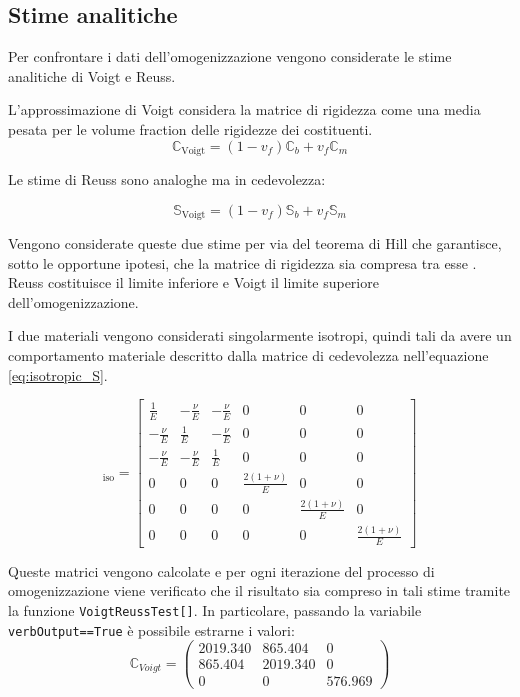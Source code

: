 \documentclass[a4paper,num-refs]{oup-contemporary}
\begin{document}
\subsection{Stime analitiche}

Per confrontare i dati dell'omogenizzazione vengono considerate le stime analitiche di Voigt e Reuss. 

L'approssimazione di Voigt considera la matrice di rigidezza come una media pesata per le volume fraction delle rigidezze dei costituenti. 
\begin{equation}
	\mathbb C_{\operatorname{Voigt}}=(1-v_f)\mathbb C_b+v_f \mathbb C_m
\end{equation}

Le stime di Reuss sono analoghe ma in cedevolezza:

\begin{equation}
	\mathbb S_{\operatorname{Voigt}}=(1-v_f)\mathbb S_b+v_f \mathbb S_m
\end{equation}

Vengono considerate queste due stime per via del teorema di Hill che garantisce, sotto le opportune ipotesi, che la matrice di rigidezza sia compresa tra esse \citep{ABOUDI201387}. Reuss costituisce il limite inferiore e Voigt il limite superiore dell'omogenizzazione. 

I due materiali vengono considerati singolarmente isotropi, quindi tali da avere un comportamento materiale descritto dalla matrice di cedevolezza  nell'equazione \ref{eq:isotropic_S}.

\begin{equation}
[\mathbb S]_{\operatorname{iso}}=\left[\begin{matrix}
	\frac{1}{E} & -\frac{\nu}{E} & -\frac{\nu}{E} & 0 & 0 & 0 \\
	-\frac{\nu}{E} & \frac{1}{E} & -\frac{\nu}{E} & 0 & 0 & 0 \\
	-\frac{\nu}{E} & -\frac{\nu}{E} & \frac{1}{E} & 0 & 0 & 0 \\
	0 & 0 & 0 & \frac{2(1+\nu)}{E} & 0 & 0 \\
	0 & 0 & 0 & 0 & \frac{2(1+\nu)}{E} & 0 \\
	0 & 0 & 0 & 0 & 0 & \frac{2(1+\nu)}{E}
\end{matrix}\right]
\label{eq:isotropic_S}
\end{equation}

Queste matrici vengono calcolate e per ogni iterazione del processo di omogenizzazione viene verificato che il risultato sia compreso in tali stime tramite la funzione \texttt{VoigtReussTest[]}. In particolare, passando la variabile \texttt{verbOutput==True} è possibile estrarne i valori:
\begin{equation}
\mathbb C_{Voigt}=\begin{pmatrix}
	2019.340&865.404&0\\
	865.404&2019.340&0\\
	0&0&576.969
	
\end{pmatrix}
\end{equation}
\end{document}

